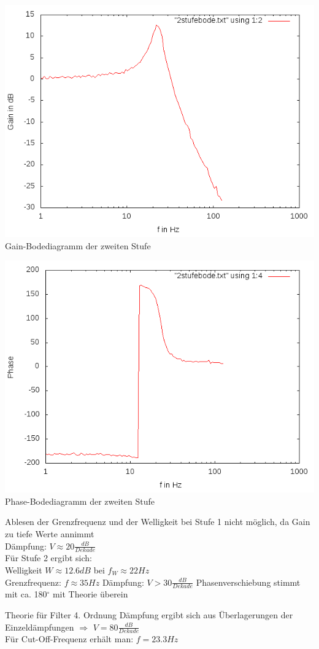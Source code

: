 \documentclass[compress,11pt]{beamer}
\begin{document}
\begin{frame}
\includegraphics[width=.7\textwidth]{4aufgabe/2stufegain}\\
Gain-Bodediagramm der zweiten Stufe
\end{frame}
\begin{frame}
\includegraphics[width=.7\textwidth]{4aufgabe/2stufephase}\\
Phase-Bodediagramm der zweiten Stufe
\end{frame}
\begin{frame}
Ablesen der Grenzfrequenz und der Welligkeit bei Stufe 1 nicht möglich, da Gain zu tiefe Werte annimmt\\
Dämpfung: $V \approx 20 \frac{dB}{Dekade}$\\
Für Stufe 2 ergibt sich:\\
Welligkeit $W \approx 12.6 dB$ bei $f_W \approx	22 Hz$\\
Grenzfrequenz: $f \approx 35 Hz$
Dämpfung: $V > 30 \frac{dB}{Dekade}$
Phasenverschiebung stimmt mit ca. 180$^\circ$ mit Theorie überein



\end{frame}
\begin{frame}
\begin{block}{Theorie für Filter 4. Ordnung}
Dämpfung ergibt sich aus Überlagerungen der Einzeldämpfungen
$\Rightarrow$ $V = 80 \frac{dB}{Dekade}$\\
Für Cut-Off-Frequenz erhält man: $f = 23.3 Hz$
\end{block}
\end{frame}
\end{document}
